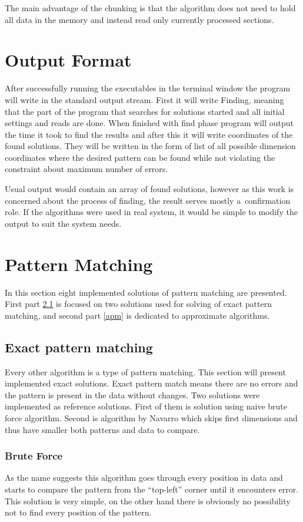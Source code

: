 The main advantage of the chunking is that the algorithm does not need to hold all data in the memory and instead read only currently processed sections.

\section{Output Format}
After successfully running the executables in the terminal window the program will write in the standard output stream. First it will write Finding, meaning that the part of the program that searches for solutions started and all initial settings and reads are done. When finished with find phase program will output the time it took to find the results and after this it will write coordinates of the found solutions. They will be written in the form of list of all possible dimension coordinates where the desired pattern can be found while not violating the constraint about maximum number of errors.

Usual output would contain an array of found solutions, however as this work is concerned about the process of finding, the result serves mostly a~confirmation role. If the algorithms were used in real system, it would be simple to modify the output to suit the system needs.

\section{Pattern Matching}
In this section eight implemented solutions of pattern matching are presented. First part \ref{epm} is focused on two solutions used for solving of exact pattern matching, and second part \ref{apm} is dedicated to approximate algorithms.

\subsection{Exact pattern matching}\label{epm}
Every other algorithm is a type of pattern matching. This section will present implemented exact solutions. Exact pattern match means there are no errors and the pattern is present in the data without changes. Two solutions were implemented as reference solutions. First of them is solution using naive brute force algorithm. Second is algorithm by Navarro which skips first dimensions and thus have smaller both patterns and data to compare.

\subsubsection{Brute Force} \label{bruteepm}
As the name suggests this algorithm goes through every position in data and starts to compare the pattern from the ``top-left'' corner until it encounters error. This solution is very simple, on the other hand there is obviously no possibility not to find every position of the pattern.

